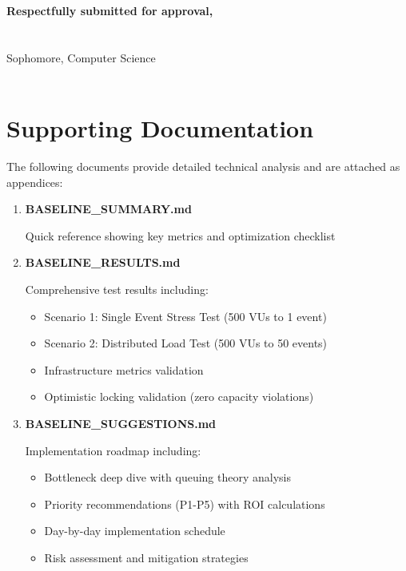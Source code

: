 \documentclass[12pt,a4paper,oneside]{report}
\begin{document}
\vspace{2em}

\noindent
\textbf{Respectfully submitted for approval,} \\
\\[1em]
 \\
Sophomore, Computer Science \\
[University Name] \\
[Date]


\clearpage

\appendix

\chapter{Supporting Documentation}

The following documents provide detailed technical analysis and are attached as appendices:

\begin{enumerate}[leftmargin=1.5em,topsep=0.3em,itemsep=0.3em]
    \item \textbf{BASELINE\_SUMMARY.md}

    Quick reference showing key metrics and optimization checklist

    \item \textbf{BASELINE\_RESULTS.md}

    Comprehensive test results including:
    \begin{itemize}[topsep=0.2em,itemsep=0.1em]
        \item Scenario 1: Single Event Stress Test (500 VUs to 1 event)
        \item Scenario 2: Distributed Load Test (500 VUs to 50 events)
        \item Infrastructure metrics validation
        \item Optimistic locking validation (zero capacity violations)
    \end{itemize}

    \item \textbf{BASELINE\_SUGGESTIONS.md}

    Implementation roadmap including:
    \begin{itemize}[topsep=0.2em,itemsep=0.1em]
        \item Bottleneck deep dive with queuing theory analysis
        \item Priority recommendations (P1-P5) with ROI calculations
        \item Day-by-day implementation schedule
        \item Risk assessment and mitigation strategies
    \end{itemize}
\end{enumerate}
\end{document}

